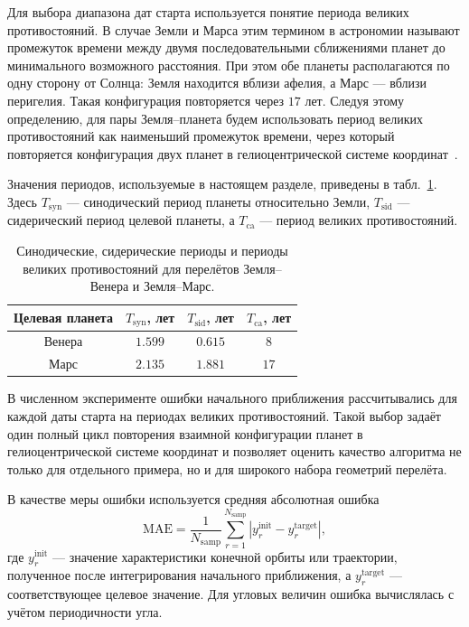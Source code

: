 Для выбора диапазона дат старта используется понятие периода великих противостояний. В случае Земли и Марса этим термином в астрономии называют промежуток времени между двумя последовательными сближениями планет до минимального возможного расстояния. При этом обе планеты располагаются по одну сторону от Солнца: Земля находится вблизи афелия, а Марс --- вблизи перигелия. Такая конфигурация повторяется через \(17\) лет. Следуя этому определению, для пары Земля--планета будем использовать период великих противостояний как наименьший промежуток времени, через который повторяется конфигурация двух планет в гелиоцентрической системе координат~\cite{sikharulidze_ballistika_2020}.

Значения периодов, используемые в настоящем разделе, приведены в табл.~\ref{tab:chap4_synodic_ca_periods}. Здесь \(T_{\mathrm{syn}}\) --- синодический период планеты относительно Земли, \(T_{\mathrm{sid}}\) --- сидерический период целевой планеты, а \(T_{\mathrm{ca}}\) --- период великих противостояний.

\begin{table}[htbp]
	\centering
	\caption{Синодические, сидерические периоды и периоды великих противостояний для перелётов Земля--Венера и Земля--Марс.}
	\label{tab:chap4_synodic_ca_periods}
	\begin{tabular}{cccc}
		\toprule
		Целевая планета &
		\(T_{\mathrm{syn}}\), лет &
		\(T_{\mathrm{sid}}\), лет &
		\(T_{\mathrm{ca}}\), лет \\
		\midrule
		Венера & \(1.599\) & \(0.615\) & \(8\) \\
		Марс  & \(2.135\) & \(1.881\) & \(17\) \\
		\bottomrule
	\end{tabular}
\end{table}

В численном эксперименте ошибки начального приближения рассчитывались для каждой даты старта на периодах великих противостояний. Такой выбор задаёт один полный цикл повторения взаимной конфигурации планет в гелиоцентрической системе координат и позволяет оценить качество алгоритма не только для отдельного примера, но и для широкого набора геометрий перелёта.

В качестве меры ошибки используется средняя абсолютная ошибка
\begin{equation}
\mathrm{MAE}
=
\frac{1}{N_{\mathrm{samp}}}
\sum_{r=1}^{N_{\mathrm{samp}}}
\left|y_r^{\mathrm{init}}-y_r^{\mathrm{target}}\right|,
\end{equation}
где \(y_r^{\mathrm{init}}\) --- значение характеристики конечной орбиты или траектории, полученное после интегрирования начального приближения, а \(y_r^{\mathrm{target}}\) --- соответствующее целевое значение. Для угловых величин ошибка вычислялась с учётом периодичности угла.


